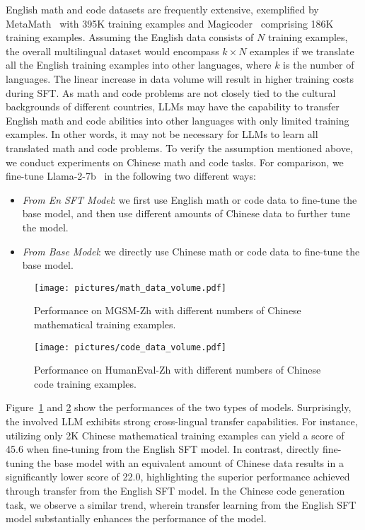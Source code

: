 \documentclass[11pt]{article}
\begin{document}
English math and code datasets are frequently extensive, exemplified by MetaMath~\cite{metamath} with 395K training examples and Magicoder~\cite{wei2023magicoder} comprising 186K training examples. Assuming the English data consists of $N$ training examples, the overall multilingual dataset would encompass $k \times N$ examples if we translate all the English training examples into other languages, where $k$ is the number of languages. The linear increase in data volume will result in higher training costs during SFT. As math and code problems are not closely tied to the cultural backgrounds of different countries, LLMs may have the capability to transfer English math and code abilities into other languages with only limited training examples. In other words, it may not be necessary for LLMs to learn all translated math and code problems.
To verify the assumption mentioned above, we conduct experiments on Chinese math and code tasks. For comparison, we fine-tune Llama-2-7b~\cite{llama2} in the following two different ways:
\begin{itemize}
    \item {\em From En SFT Model}: we first use English math or code data to fine-tune the base model, and then use different amounts of Chinese data to further tune the model.
    \item {\em From Base Model}: we directly use Chinese math or code data to fine-tune the base model.
\end{itemize}
\begin{figure}[h]
    \centering
    \texttt{[image: pictures/math\_data\_volume.pdf]}
    \caption{Performance on MGSM-Zh with different numbers of Chinese mathematical training examples.}
    \label{fig:math_data_volume}
\end{figure}
\begin{figure}[h]
    \centering
    \texttt{[image: pictures/code\_data\_volume.pdf]}
    \caption{Performance on HumanEval-Zh with different numbers of Chinese code training examples.}
    \label{fig:code_data_volume}
\end{figure}
Figure~\ref{fig:math_data_volume} and \ref{fig:code_data_volume} show the performances of the two types of models. Surprisingly, the involved LLM exhibits strong cross-lingual transfer capabilities. For instance, utilizing only 2K Chinese mathematical training examples can yield a score of 45.6 when fine-tuning from the English SFT model. In contrast, directly fine-tuning the base model with an equivalent amount of Chinese data results in a significantly lower score of 22.0, highlighting the superior performance achieved through transfer from the English SFT model. In the Chinese code generation task, we observe a similar trend, wherein transfer learning from the English SFT model substantially enhances the performance of the model.
\end{document}
